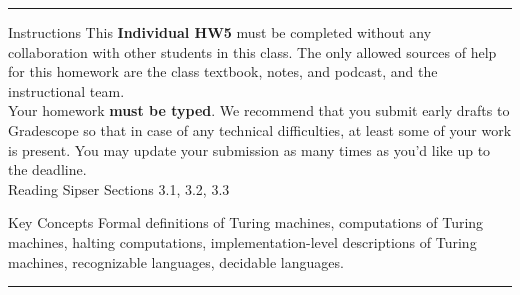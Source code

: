 \documentclass[10pt,letterpaper,unboxed,cm]{hmcpset}
\begin{document}
\begin{center}
\begin{minipage}[t]{5.7in}
\rule{\linewidth}{2pt}
{\sc Instructions}\newline
This {\bf Individual HW5} must be completed without any collaboration
with other students in this class.  The only allowed sources of help for this homework 
are the class textbook, notes, and podcast, and the instructional team.\\


Your homework {\bf must be typed}.  We recommend that you submit early drafts to Gradescope so that in 
case of any technical difficulties, at least some of your work is present.  You may update
your submission as many times as you'd like up to the deadline.\\


{\sc Reading} Sipser Sections 3.1, 3.2, 3.3
\newline

{\sc Key Concepts} Formal definitions of Turing machines, computations of Turing machines,
halting computations, implementation-level descriptions of Turing machines, recognizable languages, decidable languages.\newline

\rule{\linewidth}{2pt}
\end{minipage} \hfill

\end{center}

\problemlist{}
\end{document}
